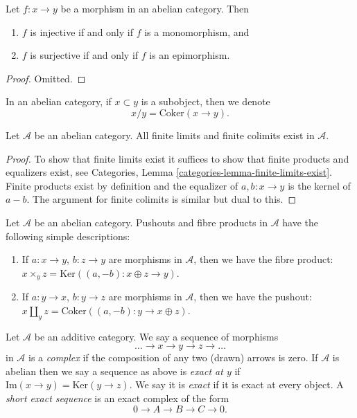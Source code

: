 \begin{lemma}
\label{lemma-characterize-injective}
Let $f : x \to y$ be a morphism in an abelian category. Then
\begin{enumerate}
\item $f$ is injective if and only if $f$ is a monomorphism, and
\item $f$ is surjective if and only if $f$ is an epimorphism.
\end{enumerate}
\end{lemma}

\begin{proof}
Omitted.
\end{proof}

\noindent
In an abelian category, if $x \subset y$ is a subobject,
then we denote
$$
x/y = \text{Coker}(x \to y).
$$

\begin{lemma}
\label{lemma-colimit-abelian-category}
Let $\mathcal{A}$ be an abelian category.
All finite limits and finite colimits exist in $\mathcal{A}$.
\end{lemma}

\begin{proof}
To show that finite limits exist it suffices to show
that finite products and equalizers exist, see
Categories, Lemma \ref{categories-lemma-finite-limits-exist}.
Finite products exist
by definition and the equalizer of $a, b : x \to y$ is
the kernel of $a - b$. The argument for finite colimits
is similar but dual to this.
\end{proof}

\begin{example}
\label{example-fibre-product-pushouts}
Let $\mathcal{A}$ be an abelian category.
Pushouts and fibre products in $\mathcal{A}$ have the following
simple descriptions:
\begin{enumerate}
\item If $a : x \to y$, $b : z \to y$ are morphisms in $\mathcal{A}$, then
we have the fibre product:
$x \times_y z = \text{Ker}((a, -b) : x \oplus z \to y)$.
\item If $a : y \to x$, $b : y \to z$ are morphisms in $\mathcal{A}$, then
we have the pushout:
$x \amalg_y z = \text{Coker}((a, -b) : y \to x \oplus z)$.
\end{enumerate}
\end{example}

\begin{definition}
\label{definition-exact}
Let $\mathcal{A}$ be an additive category.
We say a sequence of morphisms
$$
\ldots \to x \to y \to z \to \ldots
$$
in $\mathcal{A}$
is a {\it complex} if the composition of any two (drawn)
arrows is zero. If $\mathcal{A}$ is abelian then
we say a sequence as above is {\it exact at $y$} if
$\text{Im}(x \to y) = \text{Ker}(y \to z)$. We say it is {\it exact}
if it is exact at every object. A {\it short exact sequence}
is an exact complex of the form
$$
0 \to A  \to B \to C \to 0.
$$
\end{definition}

